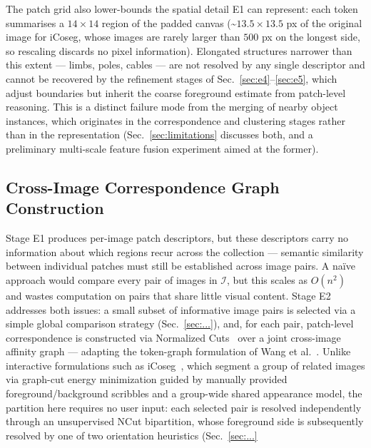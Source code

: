 The patch grid also lower-bounds the spatial detail E1 can represent:
each token summarises a $14\times14$ region of the padded canvas
(\textasciitilde$13.5\times13.5$ px of the original image for iCoseg,
whose images are rarely larger than $500$ px on the longest side, so
rescaling discards no pixel information). Elongated structures narrower
than this extent — limbs, poles, cables — are not resolved by any single
descriptor and cannot be recovered by the refinement stages of
Sec.~\ref{sec:e4}--\ref{sec:e5}, which adjust boundaries but inherit the
coarse foreground estimate from patch-level reasoning. This is a
distinct failure mode from the merging of nearby object instances, which
originates in the correspondence and clustering stages rather than in
the representation (Sec.~\ref{sec:limitations} discusses both, and a
preliminary multi-scale feature fusion experiment aimed at the former).

\subsection{Cross-Image Correspondence Graph Construction}
\label{sec:e2}

Stage E1 produces per-image patch descriptors, but these descriptors carry no information about which regions recur across the collection — semantic similarity between individual patches must still be established across image pairs. A naïve approach would compare every pair of images in $\mathcal{I}$, but this scales as $O(n^2)$ and wastes computation on pairs that share little visual content. Stage E2 addresses both issues: a small subset of informative image pairs is selected via a simple global comparison strategy (Sec.~\ref{sec:...}), and, for each pair, patch-level correspondence is constructed via Normalized Cuts~\cite{shi2000normalized} over a joint cross-image affinity graph — adapting the token-graph formulation of Wang et al.~\cite{wang2023tokencut}. Unlike interactive formulations such as iCoseg~\cite{batra2010icoseg}, which segment a group of related images via graph-cut energy minimization guided by manually provided foreground/background scribbles and a group-wide shared appearance model, the partition here requires no user input: each selected pair is resolved independently through an unsupervised NCut bipartition, whose foreground side is subsequently resolved by one of two orientation heuristics (Sec.~\ref{sec:...}

